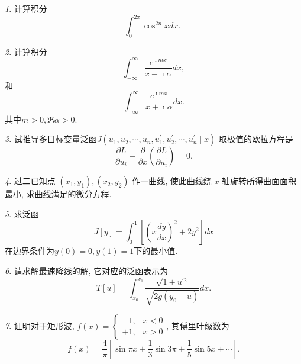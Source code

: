\documentclass[11pt]{article}
\theoremstyle{remark}
\newtheorem{problem}{}
\begin{document}
\renewcommand{\labelenumi}{(\arabic{enumi})}
\renewcommand{\labelenumii}{(\arabic{enumi}.\arabic{enumii})}



\begin{problem}
  计算积分
  $$
  \int_0^{2 \pi} \cos ^{2 n} x d x \text {. }
  $$
  \end{problem}
  
\begin{problem}
  计算积分
  $$
  \int_{-\infty}^{\infty} \frac{e^{\imath m x}}{x-\imath \alpha} d x,
  $$
  和
  $$
  \int_{-\infty}^{\infty} \frac{e^{\imath m x}}{x+\imath \alpha} d x.
  $$
  其中$m>0, \Re \alpha > 0$.
\end{problem}

\begin{problem}
  试推导多目标变量泛函$J\left(u_1, u_2, \cdots, u_n, u_1^{\prime}, u_2^{\prime}, \cdots, u_n^{\prime} \mid x\right)$
  取极值的欧拉方程是
  $$
  \frac{\partial L}{\partial u_i}-\frac{\partial}{\partial x}\left(\frac{\partial L}{\partial u_i^{\prime}}\right)=0 .
  $$
  \end{problem}
  
  
\begin{problem}
  过二已知点 $\left(x_1, y_1\right),\left(x_2, y_2\right)$ 作一曲线, 使此曲线绕 $x$ 轴旋转所得曲面面积最小, 求曲线满足的微分方程.
\end{problem}
    

\begin{problem}
求泛函
$$
J[y] = \int_0^1 \left[ \left(x \frac{dy}{dx} \right)^2 + 2 y^2 \right] dx
$$
在边界条件为$y(0) = 0, y(1) = 1$下的最小值.
\end{problem}

\begin{problem}
  请求解最速降线的解, 它对应的泛函表示为
  $$
  T[u] = \int_{x_0}^{x_1} \frac{\sqrt{1+u^{\prime 2}}}{\sqrt{2 g\left(y_0-u\right)}} d x .
  $$
\end{problem}

\begin{problem}
证明对于矩形波,
$f(x)=\left\{ \begin{array}{ll}-1, & x<0 \\ +1, &  x>0\end{array}\right.$, 其傅里叶级数为
$$
f(x)=\frac{4}{\pi} \left[  \sin \pi x+\frac{1}{3} \sin 3 \pi+\frac{1}{5 } \sin 5 x+\cdots \right].
$$
\end{problem}
\end{document}
